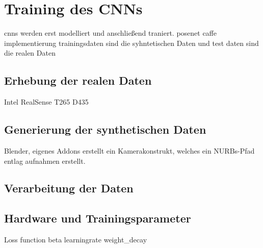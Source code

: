 
\section{Training des CNNs}
cnns werden erst modelliert und anschließend traniert.
posenet caffe implementierung
trainingsdaten sind die syhntetischen Daten und test daten sind die realen Daten


\subsection{Erhebung der realen Daten}
Intel RealSense T265 D435

\subsection{Generierung der synthetischen Daten}
Blender,
eigenes Addons erstellt ein Kamerakonstrukt, welches ein NURBs-Pfad entlag aufnahmen erstellt.

\subsection{Verarbeitung der Daten}


\subsection{Hardware und Trainingsparameter}

Loss function beta
learningrate
weight_decay